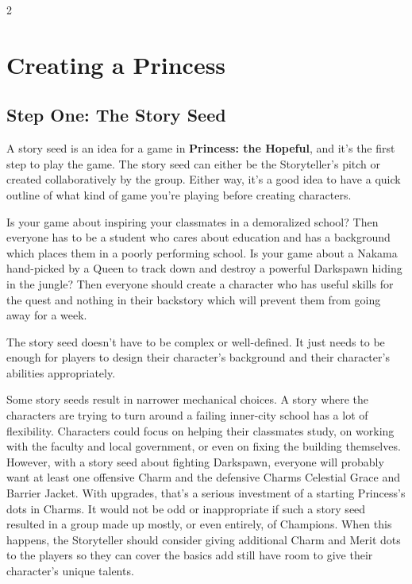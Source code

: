 \label{cha:Coronations}

\begin{multicols}{2}\raggedcolumns

\section*{Creating a Princess} 
\label{sec:CreatingAPrincess}

\subsection*{Step One: The Story Seed} 

A story seed is an idea for a game in \textbf{Princess: the Hopeful}, and it's the first step to play the game. The story seed can either be the Storyteller's pitch or created collaboratively by the group. Either way, it's a good idea to have a quick outline of what kind of game you're playing before creating characters. 

Is your game about inspiring your classmates in a demoralized school? Then everyone has to be a student who cares about education and has a background which places them in a poorly performing school. Is your game about a Nakama hand-picked by a Queen to track down and destroy a powerful Darkspawn hiding in the jungle? Then everyone should create a character who has useful skills for the quest and nothing in their backstory which will prevent them from going away for a week.

The story seed doesn't have to be complex or well-defined. It just needs to be enough for players to design their character's background and their character's abilities appropriately. 

Some story seeds result in narrower mechanical choices. A story where the characters are trying to turn around a failing inner-city school has a lot of flexibility. Characters could focus on helping their classmates study, on working with the faculty and local government, or even on fixing the building themselves. However, with a story seed about fighting Darkspawn, everyone will probably want at least one offensive Charm and the defensive Charms Celestial Grace and Barrier Jacket. With upgrades, that's a serious investment of a starting Princess's dots in Charms. It would not be odd or inappropriate if such a story seed resulted in a group made up mostly, or even entirely, of Champions. When this happens, the Storyteller should consider giving additional Charm and Merit dots to the players so they can cover the basics add still have room to give their character's unique talents.


\end{multicols}
